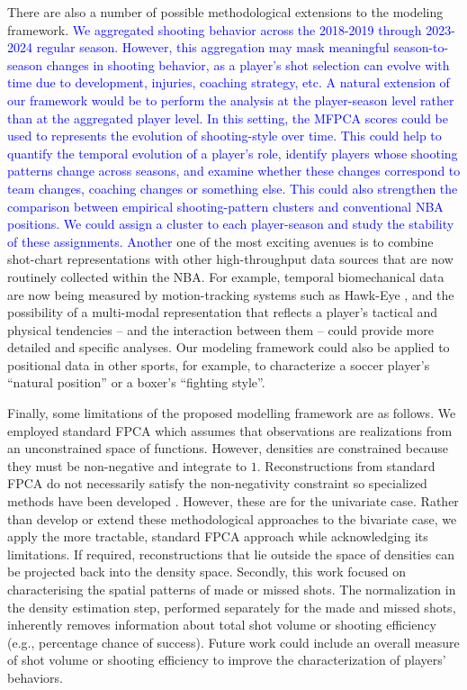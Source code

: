 \documentclass[USenglish]{article}
\theoremstyle{dgthm}
\theoremstyle{dgdef}
\begin{document}
There are also a number of possible methodological extensions to the modeling framework. 
\textcolor{blue}{We aggregated shooting behavior across the 2018-2019 through 2023-2024 regular season. However, this aggregation may mask meaningful season-to-season changes in shooting behavior, as a player's shot selection can evolve with time due to development, injuries, coaching strategy, etc. A natural extension of our framework would be to perform the analysis at the player-season level rather than at the aggregated player level. In this setting, the MFPCA scores could be used to represents the evolution of shooting-style over time. This could help to quantify the temporal evolution of a player's role, identify players whose shooting patterns change across seasons, and examine whether these changes correspond to team changes, coaching changes or something else. This could also strengthen the comparison between empirical shooting-pattern clusters and conventional NBA positions. We could assign a cluster to each player-season and study the stability of these assignments.}
\textcolor{blue}{Another} one of the most exciting avenues is to combine shot-chart representations with other high-throughput data sources that are now routinely collected within the NBA.
For example, temporal biomechanical data are now being measured by motion-tracking systems such as Hawk-Eye \citep{HawkeyeInnovation2025}, and the possibility of a multi-modal representation that reflects a player's tactical and physical tendencies -- and the interaction between them -- could provide more detailed and specific analyses.
Our modeling framework could also be applied to positional data in other sports, for example, to characterize a soccer player's ``natural position'' or a boxer's ``fighting style''.

Finally, some limitations of the proposed modelling framework are as follows.
	We employed standard FPCA which assumes that observations are realizations from an unconstrained space of functions.
		However, densities are constrained because they must be non-negative and integrate to $1$. Reconstructions from standard FPCA do not necessarily satisfy the non-negativity constraint so specialized methods have been developed \citep{petersenFunctionalDataAnalysis2016}. However, these are for the univariate case. Rather than develop or extend these methodological approaches to the bivariate case, we apply the more tractable, standard FPCA approach while acknowledging its limitations. If required, reconstructions that lie outside the space of densities can be projected back into the density space.
	Secondly, this work focused on characterising the spatial patterns of made or missed shots. The normalization in the density estimation step, performed separately for the made and missed shots, inherently removes information about total shot volume or shooting efficiency (e.g., percentage chance of success). Future work could include an overall measure of shot volume or shooting efficiency to improve the characterization of players' behaviors.
\end{document}
